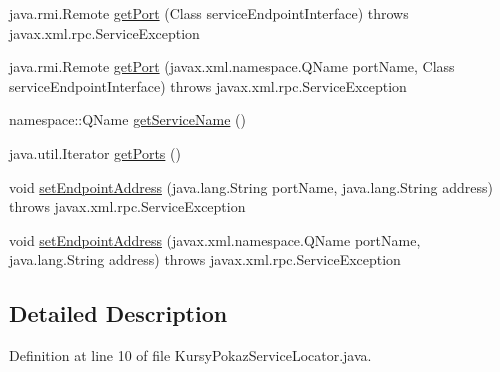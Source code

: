 \begin{DoxyCompactItemize}
\item 
java.\+rmi.\+Remote \hyperlink{classkantor_1_1com_1_1web_1_1service_1_1_kursy_pokaz_service_locator_a342d4038c3df0a6175856234f1748960}{get\+Port} (Class service\+Endpoint\+Interface)  throws javax.\+xml.\+rpc.\+Service\+Exception 
\item 
java.\+rmi.\+Remote \hyperlink{classkantor_1_1com_1_1web_1_1service_1_1_kursy_pokaz_service_locator_a848b4ee35d42a77308b8af2dfdfac21e}{get\+Port} (javax.\+xml.\+namespace.\+Q\+Name port\+Name, Class service\+Endpoint\+Interface)  throws javax.\+xml.\+rpc.\+Service\+Exception 
\item 
namespace\+::\+Q\+Name \hyperlink{classkantor_1_1com_1_1web_1_1service_1_1_kursy_pokaz_service_locator_ad766e195553030282a79619d4fe950d1}{get\+Service\+Name} ()
\item 
java.\+util.\+Iterator \hyperlink{classkantor_1_1com_1_1web_1_1service_1_1_kursy_pokaz_service_locator_a044fa9139cae5b81e520a13c15384634}{get\+Ports} ()
\item 
void \hyperlink{classkantor_1_1com_1_1web_1_1service_1_1_kursy_pokaz_service_locator_a7709d19ef1144105fa1d6006c2101fc5}{set\+Endpoint\+Address} (java.\+lang.\+String port\+Name, java.\+lang.\+String address)  throws javax.\+xml.\+rpc.\+Service\+Exception 
\item 
void \hyperlink{classkantor_1_1com_1_1web_1_1service_1_1_kursy_pokaz_service_locator_aa25f670cb43f184a2d46f4ea1e9b96cb}{set\+Endpoint\+Address} (javax.\+xml.\+namespace.\+Q\+Name port\+Name, java.\+lang.\+String address)  throws javax.\+xml.\+rpc.\+Service\+Exception 
\end{DoxyCompactItemize}


\subsection{Detailed Description}


Definition at line 10 of file Kursy\+Pokaz\+Service\+Locator.\+java.



